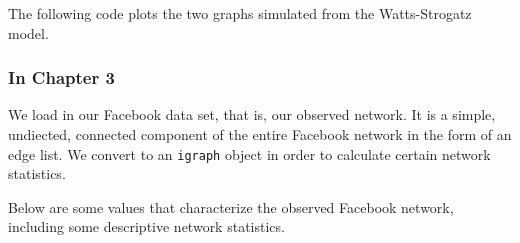 \documentclass[12pt,twoside]{amherstthesis}
\begin{document}
  The following code plots the two graphs simulated from the
  Watts-Strogatz model.
  
  \begin{Shaded}
  \begin{Highlighting}[]
  \NormalTok{(}\NormalTok{(}\NormalTok{,}\NormalTok{))}
   \NormalTok{, } \NormalTok{)}
   \NormalTok{, } \NormalTok{, }
  \end{Highlighting}
  \end{Shaded}
  
  \subsubsection{In Chapter 3}\label{in-chapter-3}
  
  We load in our Facebook data set, that is, our observed network. It is a
  simple, undiected, connected component of the entire Facebook network in
  the form of an edge list. We convert to an \texttt{igraph} object in
  order to calculate certain network statistics.
  
  \begin{Shaded}
  \begin{Highlighting}[]
  \NormalTok{(}\NormalTok{)}
  
  \StringTok{ }\NormalTok{(}\NormalTok{(}\NormalTok{), }
                                  
  
  \StringTok{ }
  \end{Highlighting}
  \end{Shaded}
  
  Below are some values that characterize the observed Facebook network,
  including some descriptive network statistics.
  
\end{document}
